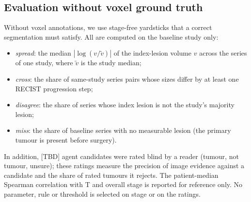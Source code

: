 \documentclass[fleqn,10pt]{olplainarticle}
\begin{document}
\subsection{Evaluation without voxel ground truth}
\label{sec:eval_protocol}
Without voxel annotations, we use stage-free yardsticks that a correct segmentation must satisfy. All are computed on
the baseline study only:
\begin{itemize}
  \item \emph{spread}: the median $|\log(v/\tilde v)|$ of the index-lesion volume $v$ across the series of one study,
  where $\tilde v$ is the study median;
  \item \emph{cross}: the share of same-study series pairs whose sizes differ by at least one RECIST progression step;
  \item \emph{disagree}: the share of series whose index lesion is not the study's majority lesion;
  \item \emph{miss}: the share of baseline series with no measurable lesion (the primary tumour is present before
  surgery).
\end{itemize}
In addition, [TBD] agent candidates were rated blind by a reader (tumour, not tumour, unsure); these ratings measure the
precision of image evidence against a candidate and the share of rated tumours it rejects. The patient-median Spearman
correlation with T and overall stage is reported for reference only. No parameter, rule or threshold is selected on stage
or on the ratings.
\end{document}
